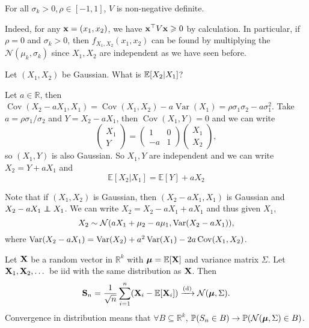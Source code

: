 \begin{claim}
    For all $ \sigma_k>0,\rho\in [-1,1] $, $V$ is non-negative definite.
\end{claim}
Indeed, for any ${\bf x}=(x_1,x_2)$, we have ${\bf x}^\top V{\bf x}\geqslant 0$ by calculation. In particular, if $\rho=0$ and $\sigma_k>0$, then $f_{X_1,X_2}(x_1,x_2)$ can be found by multiplying the $\mathcal N(\mu_k,\sigma_k)$ since $X_1,X_2$ are independent as we have seen before.


\begin{sque}
    Let $ (X_1,X_2) $ be Gaussian. What is $ {\mathbb{E}}[X_2|X_1] $?
\end{sque}

Let $a\in\mathbb R$, then $\operatorname{Cov}(X_2-aX_1,X_1)=\operatorname{Cov}(X_1,X_2)-a\operatorname{Var}(X_1)=\rho\sigma_1\sigma_2-a\sigma_1^2$. Take $a=\rho\sigma_1/\sigma_2$ and $Y=X_2-aX_1$, then $\operatorname{Cov}(X_1,Y)=0$ and we can write
$$\begin{pmatrix}
    X_1\\
    Y
\end{pmatrix}=\begin{pmatrix}
    1&0\\
    -a&1
\end{pmatrix}\begin{pmatrix}
    X_1\\
    X_2
\end{pmatrix},$$
so $(X_1,Y)$ is also Gaussian. So $X_1,Y$ are independent and we can write $X_2=Y+aX_1$ and
\[
    \boxed{\mathbb E[X_2|X_1]=\mathbb E[Y]+aX_2}
\]
\begin{note}
    Note that if $ (X_1,X_2) $ is Gaussian, then $ (X_2-aX_1,X_1) $ is Gaussian and $ X_2-aX_1 \independent X_1 $. We can write $ X_2=X_2-aX_1+aX_1 $ and thus given $ X_1 $, 
    \[
        X_2 \sim {\mathcal{N}} (aX_1+\mu_2-a\mu_1, \operatorname{Var}(X_2-aX_1)),
    \]
    where $ \operatorname{Var}(X_2-aX_1) =\operatorname{Var}(X_2)+a^2\operatorname{Var}(X_1)-2a\operatorname{Cov}(X_1,X_2)  $.
\end{note}

\begin{theorem}
    Let $ {\bf X} $ be a random vector in $ \mathbb{R}^{k} $ with $ \boldsymbol{\mu}={\mathbb{E}}[{\bf X}] $ and variance matrix $ \Sigma $. Let $ {\bf X}_1,{\bf X}_2,\dots $ be iid with the same distribution as $ {\bf X} $. Then 
    \[
        {\bf S}_n=\frac{1}{\sqrt{n}}\sum_{i=1}^n({\bf X}_i-\mathbb E[{\bf X}_i])\xrightarrow{\text{(d)}}\mathcal N(\boldsymbol{\mu},\Sigma).
    \]
    Convergence in distribution means that $ \forall B \subseteq \mathbb{R}^{k} $, $ \mathbb{P}(S_n\in B) \to \mathbb{P}({\mathcal{N}}(\boldsymbol{\mu},\Sigma)\in B) $.
\end{theorem}